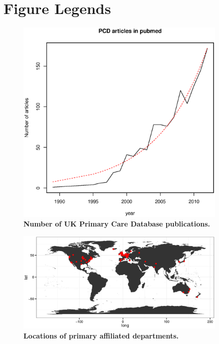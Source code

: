 \documentclass[10pt]{article}
\begin{document}
\section*{Figure Legends}

\begin{figure}[!ht]
\begin{center}
\includegraphics[width=4in]{figure/articles_per_year.eps}
\end{center}
\caption{
    {\bf Number of UK Primary Care Database publications.}
}
\label{figure1_articles_per_year}
\end{figure}

\begin{figure}[!ht]
\begin{center}
  \includegraphics[width=4in]{figure/PCD_world.eps}
\end{center}
\caption{
    {\bf Locations of primary affiliated departments.}
}
\label{figure2_PCD_map}
\end{figure}
\end{document}
